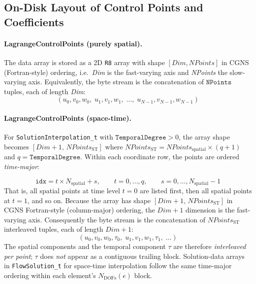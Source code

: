 \documentclass[11pt,letterpaper]{article}
\begin{document}
\subsection{On-Disk Layout of Control Points and Coefficients}
\label{sec:on-disk-layout}

\paragraph{LagrangeControlPoints (purely spatial).}
The data array is stored as a 2D \texttt{R8} array with shape
$[\textit{Dim}, \textit{NPoints}]$ in CGNS (Fortran-style) ordering, i.e.\ \textit{Dim} is the
fast-varying axis and \textit{NPoints} the slow-varying axis.  Equivalently, the byte stream is
the concatenation of $\texttt{NPoints}$ tuples, each of length \textit{Dim}:
\begin{equation*}
  (u_0, v_0, w_0,\; u_1, v_1, w_1,\; \ldots,\; u_{N-1}, v_{N-1}, w_{N-1})
\end{equation*}

\paragraph{LagrangeControlPoints (space-time).}
\begin{sloppypar}
For \texttt{SolutionInterpolation\_t} with $\texttt{TemporalDegree} > 0$, the array shape becomes
$[\textit{Dim}+1,\, \textit{NPoints}_\mathrm{ST}]$ where
$\textit{NPoints}_\mathrm{ST} = \textit{NPoints}_\mathrm{spatial} \times (q+1)$
and $q = \texttt{TemporalDegree}$.  Within each coordinate row, the points are ordered
\emph{time-major}:
\end{sloppypar}
\begin{equation*}
  \texttt{idx} = t \times N_\mathrm{spatial} + s,
  \qquad t = 0, \ldots, q,
  \qquad s = 0, \ldots, N_\mathrm{spatial}-1
\end{equation*}
That is, all spatial points at time level $t=0$ are listed first, then all spatial points at
$t=1$, and so on.  Because the array has shape $[\textit{Dim}+1,\, \textit{NPoints}_\mathrm{ST}]$
in CGNS Fortran-style (column-major) ordering, the $\textit{Dim}+1$ dimension is the
fast-varying axis.  Consequently the byte stream is the concatenation of
$\textit{NPoints}_\mathrm{ST}$ interleaved tuples, each of length $\textit{Dim}+1$:
\begin{equation*}
  (u_0, v_0, w_0, \tau_0,\; u_1, v_1, w_1, \tau_1,\; \ldots)
\end{equation*}
The spatial components and the temporal component $\tau$ are therefore \emph{interleaved per
point}; $\tau$ does \emph{not} appear as a contiguous trailing block.
Solution-data arrays in \texttt{FlowSolution\_t} for space-time interpolation
follow the same time-major ordering within each element's $N_\mathrm{DOFs}(e)$ block.
\end{document}
